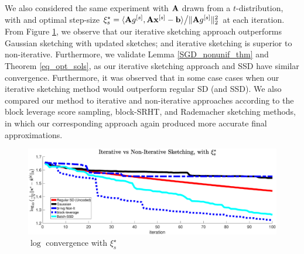 \documentclass[journal,letterpaper,onecolumn,twoside,nofonttune]{IEEEtran}
\newcommand{\bb}{\bold{b}}
\newcommand{\xb}{\bold{x}}
\newcommand{\Ab}{\bold{A}}
\begin{document}

We also considered the same experiment with $\Ab$ drawn from a $t$-distribution, with and optimal step-size $\xi_s^{\star} = \langle\Ab g^{[s]},\Ab\xb^{[s]}-\bb\rangle\big/\|\Ab g^{[s]}\|_2^2$ at each iteration. From Figure \ref{opt_step_t_distr}, we observe that our iterative sketching approach outperforms Gaussian sketching with updated sketches; and iterative sketching is superior to non-iterative. Furthermore, we validate Lemma \ref{SGD_nonunif_thm} and Theorem \ref{eq_opt_sols}, as our iterative sketching approach and SSD have similar convergence. Furthermore, it was observed that in some case cases when our iterative sketching method would outperform regular SD (and SSD). We also compared our method to iterative and non-iterative approaches according to the block leverage score sampling, block-SRHT, and Rademacher sketching methods, in which our corresponding approach again produced more accurate final approximations.

\begin{figure}[h]
  \centering
  \includegraphics[scale=.2]{comp_good_NonIt_FINAL--stretch.eps}
  \caption{$\log$ convergence with $\xi_s^{\star}$}
  \label{opt_step_t_distr}
\end{figure}
\end{document}
